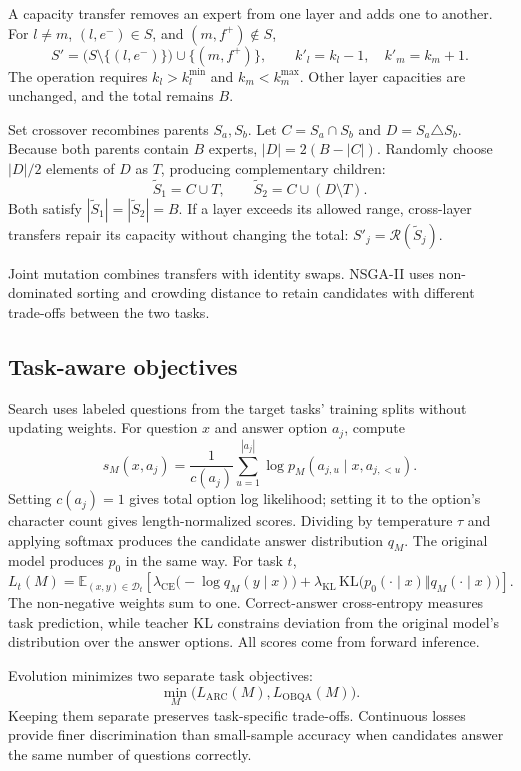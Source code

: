 \documentclass{article}
\begin{document}
A capacity transfer removes an expert from one layer and adds one to another. For $l\neq m$, $(l,e^-)\in S$, and $(m,f^+)\notin S$,
\[
S'=\bigl(S\setminus\{(l,e^-)\}\bigr)\cup\{(m,f^+)\},
\qquad
k'_l=k_l-1,\quad k'_m=k_m+1.
\]
The operation requires $k_l>k_l^{\min}$ and $k_m<k_m^{\max}$. Other layer capacities are unchanged, and the total remains $B$.

Set crossover recombines parents $S_a,S_b$. Let $C=S_a\cap S_b$ and $D=S_a\triangle S_b$. Because both parents contain $B$ experts, $|D|=2(B-|C|)$. Randomly choose $|D|/2$ elements of $D$ as $T$, producing complementary children:
\[
\widetilde S_1=C\cup T,\qquad
\widetilde S_2=C\cup(D\setminus T).
\]
Both satisfy $|\widetilde S_1|=|\widetilde S_2|=B$. If a layer exceeds its allowed range, cross-layer transfers repair its capacity without changing the total: $S'_j=\mathcal R(\widetilde S_j)$.

Joint mutation combines transfers with identity swaps. NSGA-II uses non-dominated sorting and crowding distance to retain candidates with different trade-offs between the two tasks.

\subsection{Task-aware objectives}
\label{sec:3.4}
Search uses labeled questions from the target tasks' training splits without updating weights. For question $x$ and answer option $a_j$, compute
\[
s_M(x,a_j)=\frac{1}{c(a_j)}\sum_{u=1}^{|a_j|}
\log p_M(a_{j,u}\mid x,a_{j,<u}).
\]
Setting $c(a_j)=1$ gives total option log likelihood; setting it to the option's character count gives length-normalized scores. Dividing by temperature $\tau$ and applying softmax produces the candidate answer distribution $q_M$. The original model produces $p_0$ in the same way. For task $t$,
\[
L_t(M)=\mathbb{E}_{(x,y)\in\mathcal D_t}
\left[\lambda_{\mathrm{CE}}\bigl(-\log q_M(y\mid x)\bigr)
+\lambda_{\mathrm{KL}}\,\mathrm{KL}\bigl(p_0(\cdot\mid x)\Vert q_M(\cdot\mid x)\bigr)\right].
\]
The non-negative weights sum to one. Correct-answer cross-entropy measures task prediction, while teacher KL constrains deviation from the original model's distribution over the answer options. All scores come from forward inference.

Evolution minimizes two separate task objectives:
\[
\min_M\bigl(L_{\mathrm{ARC}}(M),L_{\mathrm{OBQA}}(M)\bigr).
\]
Keeping them separate preserves task-specific trade-offs. Continuous losses provide finer discrimination than small-sample accuracy when candidates answer the same number of questions correctly.
\end{document}
